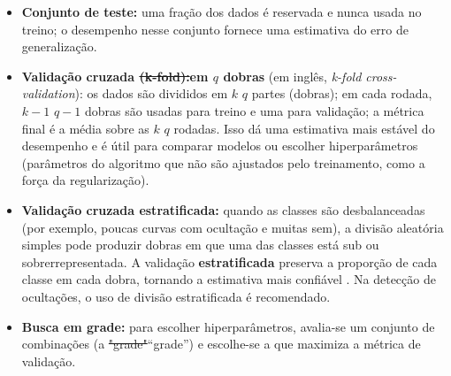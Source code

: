 \documentclass[msc]{on} %
\makeatletter
\providecommand{\DIFaddtex}[1]{{\protect\color{red}#1}} %
\providecommand{\DIFdeltex}[1]{{\protect\color{red}\sout{#1}}} %
\providecommand{\DIFaddbegin}{} %
\providecommand{\DIFaddend}{} %
\providecommand{\DIFdelbegin}{} %
\providecommand{\DIFdelend}{} %
\providecommand{\DIFadd}[1]{\texorpdfstring{\DIFaddtex{#1}}{#1}} %
\providecommand{\DIFdel}[1]{\texorpdfstring{\DIFdeltex{#1}}{}} %
\let\sout@orig\sout %
\renewcommand{\sout}[1]{\ifmmode\text{\sout@orig{\ensuremath{#1}}}\else\sout@orig{#1}\fi} %
\makeatother
\begin{document}
\begin{itemize}
	\item \textbf{Conjunto de teste:} uma fração dos dados é reservada e nunca usada no treino; o desempenho nesse conjunto fornece uma estimativa do erro de generalização.
	\item \textbf{Validação cruzada \DIFdelbegin \DIFdel{(k-fold):}\DIFdelend\ifhmode\hskip0pt\fi \DIFaddbegin \DIFadd{em $q$ dobras}\DIFaddend } \DIFaddbegin \DIFadd{(em inglês, }\textit{\DIFadd{k-fold cross-validation}}\DIFadd{): }\DIFaddend os dados são divididos em \DIFdelbegin \DIFdel{\(k\) }\DIFdelend\ifhmode\hskip0pt\fi \DIFaddbegin \DIFadd{\(q\) }\DIFaddend partes (dobras); em cada rodada, \DIFdelbegin \DIFdel{\(k-1\) }\DIFdelend\ifhmode\hskip0pt\fi \DIFaddbegin \DIFadd{\(q-1\) }\DIFaddend dobras são usadas para treino e uma para validação; a métrica final é a média sobre as \DIFdelbegin \DIFdel{\(k\) }\DIFdelend\ifhmode\hskip0pt\fi \DIFaddbegin \DIFadd{\(q\) }\DIFaddend rodadas. Isso dá uma estimativa mais estável do desempenho e é útil para comparar modelos ou escolher hiperparâmetros (parâmetros do algoritmo que não são ajustados pelo treinamento, como a força da regularização).
	\item \textbf{Validação cruzada estratificada:} quando as classes são desbalanceadas (por exemplo, poucas curvas com ocultação e muitas sem), a divisão aleatória simples pode produzir dobras em que uma das classes está sub ou sobrerrepresentada. A validação \textbf{estratificada} preserva a proporção de cada classe em cada dobra, tornando a estimativa mais confiável \citep{geron2019maos}. Na detecção de ocultações, o uso de divisão estratificada é recomendado.
	\item \textbf{Busca em grade:} para escolher hiperparâmetros, avalia-se um conjunto de combinações (a \DIFdelbegin \DIFdel{"grade"}\DIFdelend\ifhmode\hskip0pt\fi \DIFaddbegin \DIFadd{``grade''}\DIFaddend ) e escolhe-se a que maximiza a métrica de validação.
\end{itemize}
\end{document}
